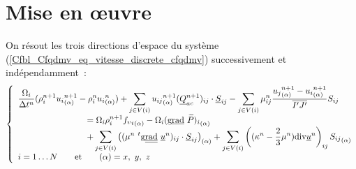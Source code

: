 %
%
%
%
%
%
%
%

\section{Mise en \oe uvre}
On r\'esout les trois directions d'espace du syst\`eme
(\ref{Cfbl_Cfqdmv_eq_vitesse_discrete_cfqdmv}) successivement et ind\'ependamment~:
\begin{equation}\label{Cfbl_Cfqdmv_eq_vitesse_finale_cfqdmv}
\left\{\begin{array}{l}
\displaystyle\frac{\Omega_i}{\Delta t^n}
(\rho_i^{n+1}{u_i}_{(\alpha)}^{n+1}-\rho_i^n{u_i}_{(\alpha)}^n)
+ \displaystyle\sum\limits_{j\in V(i)}
{u_{ij}}_{(\alpha)}^{n+1}(\vect{Q}_{ac}^{n+1})_{ij}\cdot\vect{S}_{ij}
- \displaystyle\sum\limits_{j\in V(i)}
\mu_{ij}^n\frac{{u_j}_{(\alpha)}^{n+1}-{u_i}_{(\alpha)}^{n+1}}{\overline{I'J'}}S_{ij}\\
\qquad\qquad\qquad\qquad= \Omega_i\rho_i^{n+1} {{f_v}_i}_{(\alpha)}
- \Omega_i{(\gradv{\widetilde{P}})_{i}}_{(\alpha)}\\
\qquad\qquad\qquad\qquad + \displaystyle\sum\limits_{j\in V(i)}
\left((\mu^n\ ^t\gradt{\vect{u}^n})_{ij}\cdot\vect{S}_{ij}\right)_{(\alpha)}
 + \displaystyle\sum\limits_{j\in V(i)} \left((\kappa^n-\frac{2}{3}\mu^n)
\divs{\vect{u}^n}\right)_{ij}{S_{ij}}_{(\alpha)}\\
i = 1\ldots N \qquad \text{et} \qquad (\alpha) = x,\ y,\ z\\
\end{array}\right.
\end{equation}

